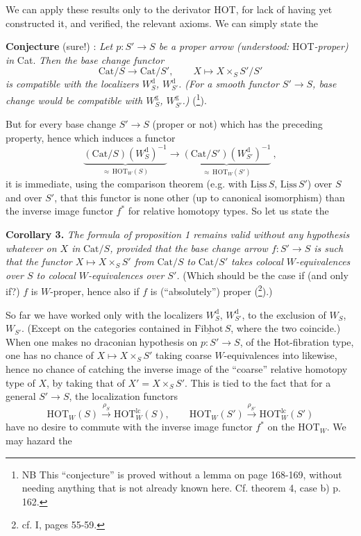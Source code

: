 \documentclass[11pt]{article}
\newcommand{\printedpage}[1]{\marginpar{\footnotesize p.~#1}}
\newcommand{\msp}[1]{\marginpar{\footnotesize [#1]}}
\newcommand{\und}[1]{\underline{\mathrm{#1}}}
\newcommand{\HOT}{\mathrm{HOT}}
\newcommand{\Cat}{\mathrm{Cat}}
\begin{document}
We can apply these results only to the derivator
\msp{page 122}
HOT, for lack of having yet constructed it, and verified, the relevant axioms. We can simply state %
the

\textbf{Conjecture} (sure!) : \textit{Let $p : S' \longrightarrow S$ be a proper arrow (understood:} HOT\textit{-proper) in} Cat. \textit{Then the base change functor}
\[
\Cat/S \longrightarrow \Cat/S', \qquad X \longmapsto X \times_S S'/S'
\]
\textit{is compatible with the localizers $W_S^{\mathrm{d}}$, $W_{S'}^{\mathrm{d}}$. (For a smooth functor $S' \longrightarrow S$, base change would be compatible with $W_S^{\mathrm{g}}$, $W_{S'}^{\mathrm{g}}$.)} (\footnote[61]{NB This ``conjecture'' is proved without a lemma on page 168-169, without needing anything that is not %
already known here. Cf. theorem 4, case b) p. 162.}).

But for every base change $S' \longrightarrow S$ (proper or not) which has the preceding property, %
hence which induces a functor
\[
\underbrace{(\Cat/S)(W_S^{\mathrm{d}})^{-1}}_{\approx\,\HOT_W(S)} \longrightarrow \underbrace{(\Cat/S')(W_{S'}^{\mathrm{d}})^{-1}}_{\approx\,\HOT_W(S')}\ ,
\]
\printedpage{76}
it is immediate, using the comparison theorem (e.g. with $\und{Liss}\,S$, $\und{Liss}\,S'$) over $S$ and over $S'$, that this functor is none other (up to canonical isomorphism) than the inverse image functor $f^*$ for relative homotopy types. So let us state the %

\textbf{Corollary 3.} \textit{The formula of proposition 1 remains valid without any hypothesis whatever on $X$ in} $\Cat/S$\textit{, provided that the base change arrow $f : S' \longrightarrow S$ is such that the functor $X \longmapsto X \times_S S'$ from} $\Cat/S$ \textit{to} $\Cat/S'$
\msp{page 123}
\textit{takes colocal $W$-equivalences over $S$ to colocal $W$-equivalences over $S'$.} (Which should be the case if (and only if?) $f$ is $W$-proper, hence also if $f$ is (``absolutely'') proper (\footnote[62]{cf. I, pages 55-59.}).)

So far we have worked only with the localizers $W_S^{\mathrm{d}}$, $W_{S'}^{\mathrm{d}}$, to the exclusion of $W_S$, $W_{S'}$. (Except on the categories contained in $\und{Fibhot}\,S$, where the two coincide.) When one makes no draconian hypothesis on $p : S' \longrightarrow S$, of the Hot-fibration type, one has no chance of $X \longmapsto X \times_S S'$ taking coarse $W$-equivalences into likewise, hence no chance of catching the inverse image of the ``coarse'' relative homotopy type of $X$, by taking that of $X' = X \times_S S'$. This is tied to the fact that for a general $S' \longrightarrow S$, the localization functors
\[
\HOT_W(S) \xrightarrow{\rho_S} \HOT_W^{\mathrm{lc}}(S), \qquad \HOT_W(S') \xrightarrow{\rho_{S'}} \HOT_W^{\mathrm{lc}}(S')
\]
have no desire to commute with the inverse image functor $f^*$ on the $\HOT_W$. We may hazard the
\end{document}
